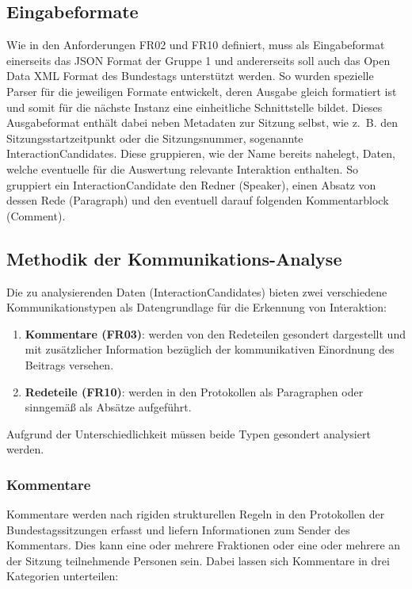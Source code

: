 \subsection{Eingabeformate}
Wie in den Anforderungen FR02 und FR10 definiert, muss als Eingabeformat
einerseits das JSON Format der Gruppe 1 und andererseits soll auch das
Open Data XML Format des Bundestags unterstützt werden. So wurden
spezielle Parser für die jeweiligen Formate entwickelt, deren Ausgabe gleich
formatiert ist und somit für die nächste Instanz eine einheitliche
Schnittstelle bildet. Dieses Ausgabeformat enthält dabei neben Metadaten zur
Sitzung selbst, wie z.~B. den Sitzungsstartzeitpunkt oder die Sitzungsnummer,
sogenannte InteractionCandidates. Diese gruppieren, wie der Name bereits
nahelegt, Daten, welche eventuelle für die Auswertung relevante Interaktion
enthalten. So gruppiert ein InteractionCandidate den Redner (Speaker),
einen Absatz von dessen Rede (Paragraph) und den eventuell darauf folgenden
Kommentarblock (Comment).

\subsection{Methodik der Kommunikations-Analyse}
Die zu analysierenden Daten (InteractionCandidates) bieten zwei verschiedene
Kommunikationstypen als Datengrundlage für die Erkennung von Interaktion:

\begin{enumerate}
    \item \textbf{Kommentare (FR03)}: werden von den Redeteilen gesondert
        dargestellt und mit zusätzlicher Information bezüglich der
        kommunikativen Einordnung des Beitrags versehen.
    \item \textbf{Redeteile (FR10)}: werden in den Protokollen als
        Paragraphen oder sinngemäß als Absätze aufgeführt.
\end{enumerate}

Aufgrund der Unterschiedlichkeit müssen beide Typen gesondert analysiert werden.

\subsubsection{Kommentare}

Kommentare werden nach rigiden strukturellen Regeln in den Protokollen der
Bundestagssitzungen erfasst und liefern Informationen zum Sender des
Kommentars. Dies kann eine oder mehrere Fraktionen oder eine oder mehrere an
der Sitzung teilnehmende Personen sein. Dabei lassen sich Kommentare in drei
Kategorien unterteilen:

